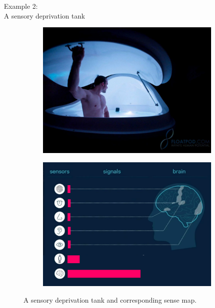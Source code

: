 \documentclass{article}
\begin{document}
\pagebreak

\begin{center}
  \LARGE{Example 2:}\\
  \LARGE{A sensory deprivation tank}
\end{center}

\begin{figure}[h!]
  \centering
  \begin{subfigure}[b]{0.48\linewidth}
    \includegraphics[width=\linewidth]{images/attention2-tank.jpg}
  \end{subfigure}
  \begin{subfigure}[b]{0.48\linewidth}
    \includegraphics[width=\linewidth]{images/ma-sensory-deprivation-tank.png}
  \end{subfigure}
  \caption{A sensory deprivation tank and corresponding sense map.}
  \label{fig:sensory-deprivation-tank}
\end{figure}
\end{document}
